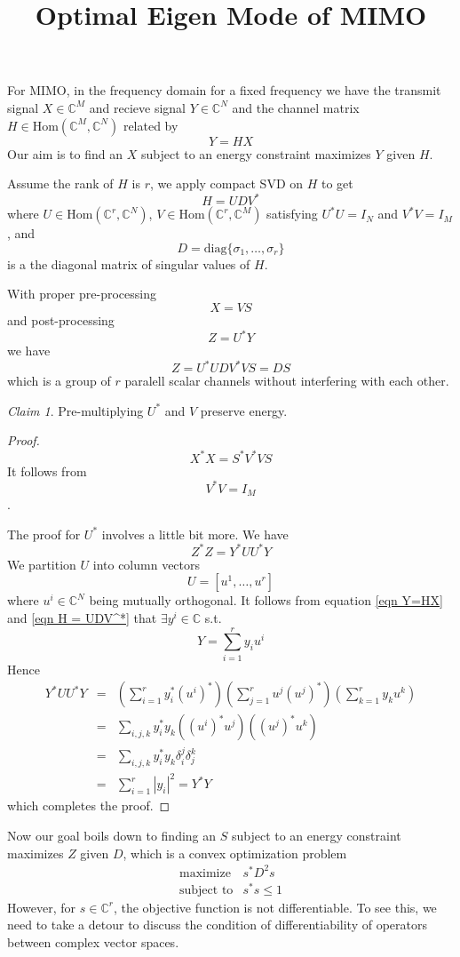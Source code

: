 \documentclass[12pt]{article}
\title{Optimal Eigen Mode of MIMO}
\theoremstyle{remark}
\newtheorem{claim}{Claim}
\begin{document}
\maketitle

For MIMO, in the frequency domain for a fixed frequency we have the transmit signal $X\in\mathbb{C}^M$ and recieve signal $Y\in \mathbb{C}^N$ and the channel matrix $H\in\mbox{Hom}\left(\mathbb{C}^M, \mathbb{C}^N\right)$ related by
\begin{equation}
Y=HX\label{eqn Y=HX}
\end{equation}
Our aim is to find an $X$ subject to an energy constraint maximizes $Y$ given $H$. 

Assume the rank of $H$ is $r$, we apply compact SVD on $H$ to get
\begin{equation}
	H = UDV^*\label{eqn H = UDV^*}
\end{equation}
where $U\in\mbox{Hom}\left(\mathbb{C}^r,\mathbb{C}^N \right)$, $V\in\mbox{Hom}\left(\mathbb{C}^r,\mathbb{C}^M \right)$ satisfying $U^*U=I_N$ and $V^*V=I_M$, and
$$
D=\mbox{diag}\{\sigma_1,\dots,\sigma_r \}
$$
is a the diagonal matrix of singular values of $H$.

With proper pre-processing
$$X=VS$$
and post-processing
$$Z=U^*Y$$
we have
$$Z=U^*UDV^*VS=DS$$
which is a group of $r$ paralell scalar channels without interfering with each other.
\begin{claim}
	Pre-multiplying $U^*$ and $V$ preserve energy.
\end{claim}
\begin{proof}
	$$X^*X=S^*V^*VS$$
	It follows from $$V^*V=I_M$$.
	
	The proof for $U^*$ involves a little bit more. We have
	$$Z^*Z=Y^*UU^*Y$$
	We partition $U$ into column vectors
	$$U=\left[u^1,\dots,u^r \right]$$
	where $u^i\in\mathbb{C}^N$ being mutually orthogonal. It follows from equation \ref{eqn Y=HX} and \ref{eqn H = UDV^*} that $\exists y^i\in\mathbb{C}$ s.t. 
	$$Y=\sum_{i=1}^ry_iu^i$$
	Hence
	\begin{eqnarray*}
		Y^*UU^*Y&=&\left(\sum_{i=1}^ry_i^*(u^i)^* \right)\left(\sum_{j=1}^ru^j(u^j)^* \right)\left(\sum_{k=1}^ry_ku^k\right)\\
		&=&\sum_{i,j,k}y_i^*y_k\left((u^i)^*u^j\right)\left((u^j)^*u^k\right)\\
		&=&\sum_{i,j,k}y_i^*y_k\delta_i^j\delta_j^k\\
		&=&\sum_{i=1}^r|y_i|^2=Y^*Y
	\end{eqnarray*}
which completes the proof.
\end{proof}
Now our goal boils down to finding an $S$ subject to an energy constraint maximizes $Z$ given $D$, which is a convex optimization problem
\begin{equation}
	\begin{array}{ll}
	\mbox{maximize}&s^*D^2s\\
	\mbox{subject to}&s^*s\leq1
\end{array}\label{eqn s^*D^2s}
\end{equation}
However, for $s\in\mathbb{C}^r$, the objective function is not differentiable. To see this, we need to take a detour to discuss the condition of differentiability of operators between complex vector spaces.
\end{document}
